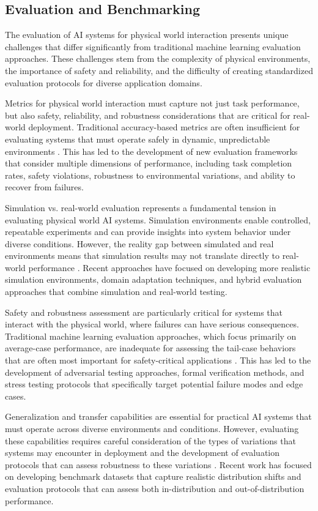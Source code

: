 \subsection{Evaluation and Benchmarking}

The evaluation of AI systems for physical world interaction presents unique challenges that differ significantly from traditional machine learning evaluation approaches. These challenges stem from the complexity of physical environments, the importance of safety and reliability, and the difficulty of creating standardized evaluation protocols for diverse application domains.

Metrics for physical world interaction must capture not just task performance, but also safety, reliability, and robustness considerations that are critical for real-world deployment. Traditional accuracy-based metrics are often insufficient for evaluating systems that must operate safely in dynamic, unpredictable environments \cite{dulac2019challenges}. This has led to the development of new evaluation frameworks that consider multiple dimensions of performance, including task completion rates, safety violations, robustness to environmental variations, and ability to recover from failures.

Simulation vs. real-world evaluation represents a fundamental tension in evaluating physical world AI systems. Simulation environments enable controlled, repeatable experiments and can provide insights into system behavior under diverse conditions. However, the reality gap between simulated and real environments means that simulation results may not translate directly to real-world performance \cite{zhao2020sim}. Recent approaches have focused on developing more realistic simulation environments, domain adaptation techniques, and hybrid evaluation approaches that combine simulation and real-world testing.

Safety and robustness assessment are particularly critical for systems that interact with the physical world, where failures can have serious consequences. Traditional machine learning evaluation approaches, which focus primarily on average-case performance, are inadequate for assessing the tail-case behaviors that are often most important for safety-critical applications \cite{amodei2016concrete}. This has led to the development of adversarial testing approaches, formal verification methods, and stress testing protocols that specifically target potential failure modes and edge cases.

Generalization and transfer capabilities are essential for practical AI systems that must operate across diverse environments and conditions. However, evaluating these capabilities requires careful consideration of the types of variations that systems may encounter in deployment and the development of evaluation protocols that can assess robustness to these variations \cite{koh2021wilds}. Recent work has focused on developing benchmark datasets that capture realistic distribution shifts and evaluation protocols that can assess both in-distribution and out-of-distribution performance.


